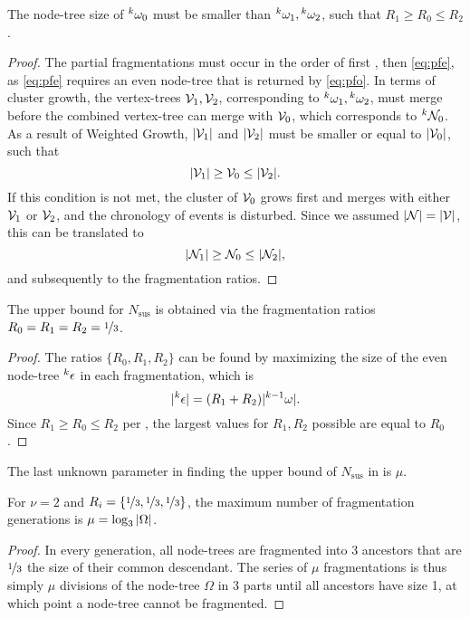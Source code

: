 \begin{lemma}\label{lem:chrono}
  The node-tree size of ${}^{k}\omega_0$ must be smaller than ${}^{k}\omega_1, {}^{k}\omega_2$, such that $R_1 \geq R_0 \leq R_2$. 
\end{lemma}
\begin{proof}
  The partial fragmentations must occur in the order of first , then \eqref{eq:pfe}, as \eqref{eq:pfe} requires an even node-tree that is returned by \eqref{eq:pfo}. In terms of cluster growth, the vertex-trees $\mathcal{V}_1, \mathcal{V}_2$, corresponding to ${}^{k}\omega_1, {}^{k}\omega_2$, must merge before the combined vertex-tree can merge with $\mathcal{V}_0$, which corresponds to ${}^{k}\mathcal{N}_0$. As a result of Weighted Growth, $\lvert\mathcal{V}_1\rvert$ and $\lvert\mathcal{V}_2\rvert$ must be smaller or equal to $\lvert\mathcal{V}_0\rvert$, such that 
  \begin{equation*}
    \lvert\mathcal{V}_1\rvert\geq \mathcal{V}_0 \leq\lvert\mathcal{V}_2\rvert.
  \end{equation*}
  If this condition is not met, the cluster of $\mathcal{V}_0$ grows first and merges with either $\mathcal{V}_1$ or $\mathcal{V}_2$, and the chronology of events is disturbed. Since we assumed $\lvert\mathcal{N}\rvert=\lvert\mathcal{V}\rvert$, this can be translated to 
  \begin{equation*}
    \lvert\mathcal{N}_1\rvert\geq \mathcal{N}_0 \leq\lvert\mathcal{N}_2\rvert,
  \end{equation*}
  and subsequently to the fragmentation ratios.
\end{proof}

\begin{theorem}\label{the:ratios}
  The upper bound for $N_{\text{sus}}$ is obtained via the fragmentation ratios $R_0 = R_1 = R_2 = \nicefrac{1}{3}$.
\end{theorem}
\begin{proof}
  The ratios $\{R_0, R_1, R_2\}$ can be found by maximizing the size of the even node-tree ${}^{k}\epsilon$ in each fragmentation, which is 
  \begin{equation*}
    \lvert{}^{k}\epsilon\rvert = (R_1 + R_2)\lvert{}^{k-1}\omega\rvert.
  \end{equation*}
  Since $ R_1 \geq R_0 \leq R_2$ per , the largest values for $R_1, R_2$ possible are equal to $R_0$.
\end{proof}

The last unknown parameter in finding the upper bound of $N_{\text{sus}}$ in  is $\mu$.

\begin{theorem}\label{the:km}
  For $\nu = 2$ and $R_i = \{\nicefrac{1}{3},\nicefrac{1}{3},\nicefrac{1}{3}\}$, the maximum number of fragmentation generations is $\mu = \log_3{\lvert\Omega\rvert}$.
\end{theorem}
\begin{proof}
  In every generation, all node-trees are fragmented into 3 ancestors that are $\nicefrac{1}{3}$ the size of their common descendant. The series of $\mu$ fragmentations is thus simply $\mu$ divisions of the node-tree $\Omega$ in 3 parts until all ancestors have size 1, at which point a node-tree cannot be fragmented.
\end{proof}

